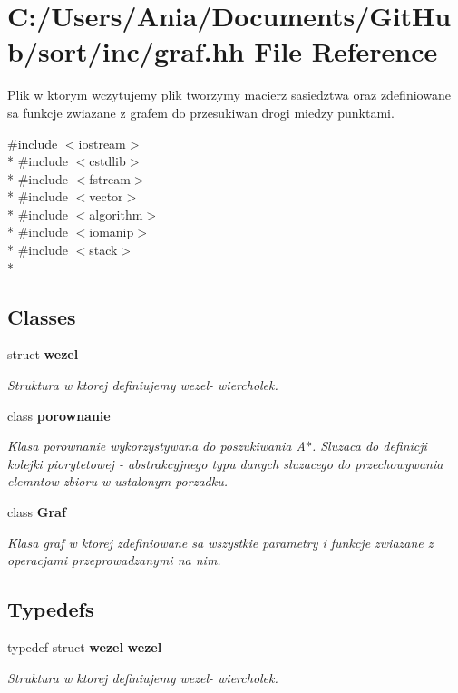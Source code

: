 \section{C\-:/\-Users/\-Ania/\-Documents/\-Git\-Hub/sort/inc/graf.hh File Reference}
\label{graf_8hh}


Plik w ktorym wczytujemy plik tworzymy macierz sasiedztwa oraz zdefiniowane sa funkcje zwiazane z grafem do przesukiwan drogi miedzy punktami.  


{\ttfamily \#include $<$iostream$>$}\\*
{\ttfamily \#include $<$cstdlib$>$}\\*
{\ttfamily \#include $<$fstream$>$}\\*
{\ttfamily \#include $<$vector$>$}\\*
{\ttfamily \#include $<$algorithm$>$}\\*
{\ttfamily \#include $<$iomanip$>$}\\*
{\ttfamily \#include $<$stack$>$}\\*
\subsection*{Classes}
\begin{DoxyCompactItemize}
\item 
struct {\bf wezel}
\begin{DoxyCompactList}\small\item\em Struktura w ktorej definiujemy wezel-\/ wiercholek. \end{DoxyCompactList}\item 
class {\bf porownanie}
\begin{DoxyCompactList}\small\item\em Klasa porownanie wykorzystywana do poszukiwania A$\ast$. Sluzaca do definicji kolejki piorytetowej -\/ abstrakcyjnego typu danych sluzacego do przechowywania elemntow zbioru w ustalonym porzadku. \end{DoxyCompactList}\item 
class {\bf Graf}
\begin{DoxyCompactList}\small\item\em Klasa graf w ktorej zdefiniowane sa wszystkie parametry i funkcje zwiazane z operacjami przeprowadzanymi na nim. \end{DoxyCompactList}\end{DoxyCompactItemize}
\subsection*{Typedefs}
\begin{DoxyCompactItemize}
\item 
typedef struct {\bf wezel} {\bf wezel}
\begin{DoxyCompactList}\small\item\em Struktura w ktorej definiujemy wezel-\/ wiercholek. \end{DoxyCompactList}\end{DoxyCompactItemize}


